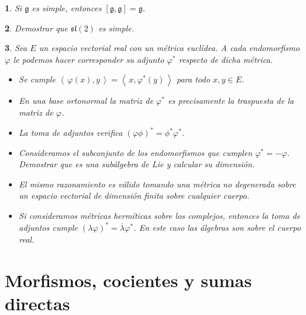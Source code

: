 \documentclass[a4paper,draft,12pt]{scrartcl}
\newtheorem{pro1}{}%
\newenvironment{pro}{\begin{pro1} \rm} {\end{pro1}}
\newcommand{\g}{\mathfrak{g}}%
\newcommand{\escalar}[2]{\left\langle\, #1,#2\, \right\rangle}  %
\begin{document}
\begin{pro}

Si $\g$ es simple, entonces $[\g,\g]=\g$.

\end{pro}




\begin{pro}

Demostrar que $\mathfrak{sl}(2)$ es simple.

\end{pro}


\begin{pro}

Sea $E$ un espacio vectorial real con un métrica euclídea.  A cada endomorfismo $\varphi$ le podemos hacer corresponder su adjunto $\varphi^*$ respecto de dicha métrica.

\begin{itemize}

\item Se cumple $\escalar{\varphi(x)}{y}= \escalar{x}{\varphi^*(y)}$ para todo $x, y \in E$.

\item En una base ortonormal la matriz de $\varphi^*$ es precisamente la traspuesta de la matriz de $\varphi$.

\item La toma de adjuntos verifica $(\varphi \phi)^*= \phi^*\varphi^*$.

\item Consideramos el subconjunto de los endomorfismos que cumplen $\varphi^*= - \varphi$.  Demostrar que es una subálgebra de Lie y calcular su dimensión.

\item El mismo razonamiento es válido tomando una métrica no degenerada sobre un espacio vectorial de dimensión finita sobre cualquier cuerpo.

\item  Si consideramos métricas hermíticas sobre los complejos, entonces la toma de adjuntos cumple $(\lambda \varphi)^*= \overline{\lambda}\varphi^*$.  En este caso las álgebras son sobre el cuerpo real.

\end{itemize}


\end{pro}


\newpage

\section{Morfismos, cocientes y sumas directas}
\end{document}
